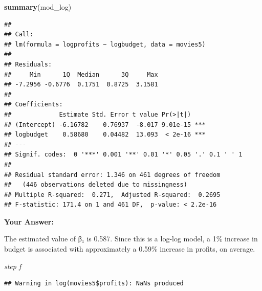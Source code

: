 \documentclass[
]{article}
\newenvironment{Shaded}{\begin{snugshade}}{\end{snugshade}}
\newcommand{\FunctionTok}[1]{\textcolor[rgb]{0.13,0.29,0.53}{\textbf{#1}}}
\newcommand{\NormalTok}[1]{#1}
\newcommand{\OtherTok}[1]{\textcolor[rgb]{0.56,0.35,0.01}{#1}}
\newcommand{\SpecialCharTok}[1]{\textcolor[rgb]{0.81,0.36,0.00}{\textbf{#1}}}
\begin{document}
\begin{Shaded}
\begin{Highlighting}[]
\FunctionTok{summary}\NormalTok{(mod\_log)}
\end{Highlighting}
\end{Shaded}

\begin{verbatim}
## 
## Call:
## lm(formula = logprofits ~ logbudget, data = movies5)
## 
## Residuals:
##     Min      1Q  Median      3Q     Max 
## -7.2956 -0.6776  0.1751  0.8725  3.1581 
## 
## Coefficients:
##             Estimate Std. Error t value Pr(>|t|)    
## (Intercept) -6.16782    0.76937  -8.017 9.01e-15 ***
## logbudget    0.58680    0.04482  13.093  < 2e-16 ***
## ---
## Signif. codes:  0 '***' 0.001 '**' 0.01 '*' 0.05 '.' 0.1 ' ' 1
## 
## Residual standard error: 1.346 on 461 degrees of freedom
##   (446 observations deleted due to missingness)
## Multiple R-squared:  0.271,  Adjusted R-squared:  0.2695 
## F-statistic: 171.4 on 1 and 461 DF,  p-value: < 2.2e-16
\end{verbatim}

\textbf{Your Answer:}

The estimated value of β₁ is 0.587. Since this is a log-log model, a 1\%
increase in budget is associated with approximately a 0.59\% increase in
profits, on average.

\emph{step f}

\begin{Shaded}
\end{Shaded}

\begin{verbatim}
## Warning in log(movies5$profits): NaNs produced
\end{verbatim}
\end{document}
